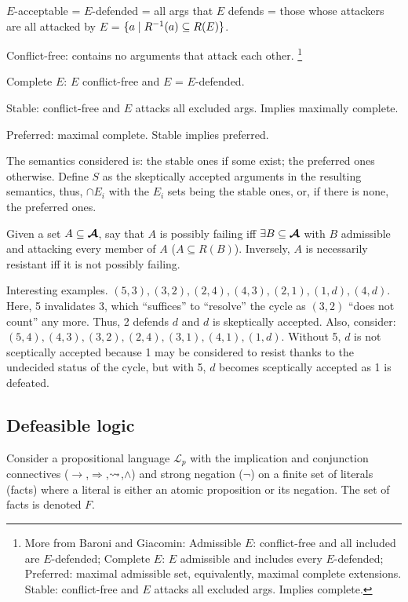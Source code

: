 \documentclass[version=3.21, pagesize, twoside=off, bibliography=totoc, DIV=calc, fontsize=12pt, a4paper, french, english]{scrartcl}
\begin{document}
$E$-acceptable = $E$-defended = all args that $E$ defends = those whose attackers are all attacked by $E$ = $\set{a \suchthat R^{-1}(a)\subseteq R(E)}$.

Conflict-free: contains no arguments that attack each other.
\footnote{More from Baroni and Giacomin: Admissible $E$: conflict-free and all included are $E$-defended; Complete $E$: $E$ admissible and includes every $E$-defended; Preferred: maximal admissible set, equivalently, maximal complete extensions. Stable: conflict-free and $E$ attacks all excluded args. Implies complete.}

Complete $E$: $E$ conflict-free and $E$ = $E$-defended.

Stable: conflict-free and $E$ attacks all excluded args. Implies maximally complete.

Preferred: maximal complete. Stable implies preferred. 

The semantics considered is: the stable ones if some exist; the preferred ones otherwise. Define $S$ as the skeptically accepted arguments in the resulting semantics, thus, $\cap E_i$ with the $E_i$ sets being the stable ones, or, if there is none, the preferred ones.

Given a set $A \subseteq \bm{\mathcal{A}}$, say that $A$ is possibly failing iff $\exists B \subseteq \bm{\mathcal{A}}$ with $B$ admissible and attacking every member of $A$ ($A \subseteq R(B)$).
Inversely, $A$ is necessarily resistant iff it is not possibly failing.

Interesting examples. $(5, 3), (3, 2), (2, 4), (4, 3), (2, 1), (1, d), (4, d)$. Here, 5 invalidates 3, which “suffices” to “resolve” the cycle as $(3, 2)$ “does not count” any more. Thus, 2 defends $d$ and $d$ is skeptically accepted. Also, consider: $(5, 4), (4, 3), (3, 2), (2, 4), (3, 1), (4, 1), (1, d)$. Without 5, $d$ is not sceptically accepted because 1 may be considered to resist thanks to the undecided status of the cycle, but with 5, $d$ becomes sceptically accepted as 1 is defeated.

\subsection{Defeasible logic}

Consider a propositional language $\mathcal{L}_p$ with the implication and conjunction connectives ($\rightarrow$,$\Rightarrow$,$\mathrel{\leadsto}$,$\land$) and strong negation ($\lnot$) on a finite set of literals (facts) where a literal is either an atomic proposition or its negation. 
The set of facts is denoted $F$.
\end{document}
